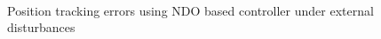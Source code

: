 \documentclass[letterpaper%
, twoside%
, 12pt%
,memoire%
, english%
,creativecommons,hyperref%
]{thETS}
\begin{document}
\begin{figure}[H]
	\centering
	 \\ \parbox{0.75\textwidth}{\caption{Position tracking errors using NDO based controller under external disturbances\label{Fig:xyzerrNDODist}}}
\end{figure}
\end{document}
